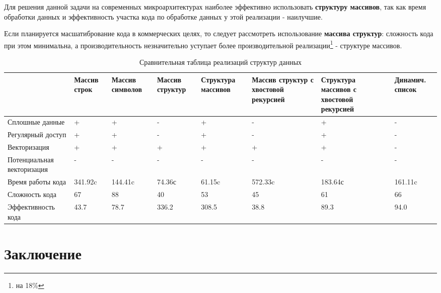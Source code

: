 \documentclass[a4paper, 12pt] {article}
\begin{document}
  Для решения данной задачи на современных микроархитектурах
наиболее эффективно использовать \textbf{структуру массивов}, так как время
обработки данных и эффективность участка кода по обработке данных у
этой реализации - наилучшие. 

  Если планируется масшатибрование кода в коммерческих целях, то следует рассмотреть
использование \textbf{массива структур}: сложность кода при этом минимальна, а
производительность незначительно уступает более производительной
реализации\footnote{на 18\%} - структуре массивов.\smallskip\\
  
\begin{table}[h] %
  \begin{small}
    \begin{tabular}{|p{7em}|p{4em}|p{4em}|p{4em}|p{5em}|p{5em}|p{5em}|p{5em}|}
      \hline & Массив строк & Массив символов & \textbf{Массив структур} &%
          Структура массивов & Массив структур с хвостовой рекурсией &%
          Структура массивов с хвостовой рекурсией &%
          Динамич. список\\ \hline
          
  Сплошные данные             & + & + & - & + & - & + & - \\ \hline
  Регулярный доступ           & + & + & - & + & - & + & - \\ \hline
  Векторизация \hspace{2em}   & + & + & + & + & + & + & - \\ \hline
  Потенциальная векторизация  & - & - & - & - & - & - & - \\ \hline
  Время работы кода           & 341.92c & 144.41c & 74.36с &
  61.15c & 572.33c & 183.64с & 161.11c \\ \hline
  Сложность \hspace{1em} кода & 67 & 88 & 40 & 53 & 45 & 61 & 66 \\ \hline
  Эффективность кода          & 43.7 & 78.7  & 336.2 & 308.5 & 38.8 &
  89.3 & 94.0 \\ \hline

  \end{tabular}
  \end{small}
  \caption{Сравнительная таблица реализаций структур данных}
\label{data_structures_table}
\end{table}

\newpage
\section{Заключение}
\end{document}
